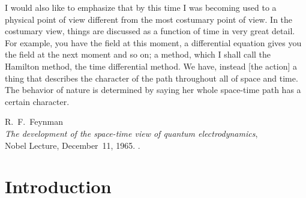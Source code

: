 

\label{chp:fundamentals} 


\begin{quoting}
   \openquote I would also like to emphasize that by this time I was becoming
   used to a physical point of view different from the most costumary point of
   view. In the costumary view, things are discussed as a function of time in
   very great detail.  For example, you have the field at this moment, a
   differential equation gives you the field at the next moment and so on; a
   method, which I shall call the Hamilton method, the time differential method.
   We have, instead [the action] a thing that describes the character of the
   path throughout all of space and time. The behavior of nature is determined
   by saying her whole space-time path has a certain character.~\closequote
   \begin{signature}
       R.~F.~Feynman \\
       \emph{The development of the space-time view of quantum 
	  electrodynamics}, \\
       Nobel Lecture, December~11, 1965.
       \textcite{Brown_ed:2000}.
    \end{signature}
\end{quoting}

\section{Introduction}

